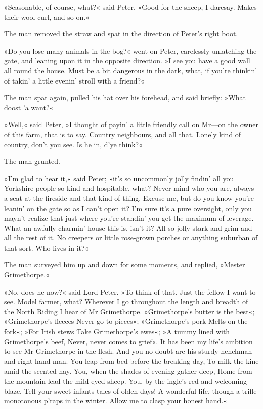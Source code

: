»Seasonable, of course, what?« said Peter. »Good for the sheep, I daresay. Makes their wool curl, and so on.«

The man removed the straw and spat in the direction of Peter's right boot.

»Do you lose many animals in the bog?« went on Peter, carelessly unlatching the gate, and leaning upon it in the opposite direction. »I see you have a good wall all round the house. Must be a bit dangerous in the dark, what, if you're thinkin' of takin' a little evenin' stroll with a friend?«

The man spat again, pulled his hat over his forehead, and said briefly:
»What doost 'a want?«

»Well,« said Peter, »I thought of payin' a little friendly call on Mr—on the owner of this farm, that is to say. Country neighbours, and all that. Lonely kind of country, don't you see. Is he in, d'ye think?«

The man grunted.

»I'm glad to hear it,« said Peter; »it's so uncommonly jolly findin' all you Yorkshire people so kind and hospitable, what? Never mind who you are, always a seat at the fireside and that kind of thing. Excuse me, but do you know you're leanin' on the gate so as I can't open it?  I'm sure it's a pure oversight, only you mayn't realize that just where you're standin' you get the maximum of leverage. What an awfully charmin' house this is, isn't it? All so jolly stark and grim and all the rest of it. No creepers or little rose-grown porches or anything suburban of that sort. Who lives in it?«

The man surveyed him up and down for some moments, and replied, »Mester Grimethorpe.«

»No, does he now?« said Lord Peter. »To think of that. Just the fellow I want to see. Model farmer, what? Wherever I go throughout the length and breadth of the North Riding I hear of Mr Grimethorpe.  »Grimethorpe's butter is the best«; »Grimethorpe's fleeces Never go to pieces«; »Grimethorpe's pork Melts on the fork«; »For Irish stews Take Grimethorpe's ewes«; »A tummy lined with Grimethorpe's beef, Never, never comes to grief«. It has been my life's ambition to see Mr  Grimethorpe in the flesh. And you no doubt are his sturdy henchman and right-hand man. You leap from bed before the breaking-day, To milk the kine amid the scented hay. You, when the shades of evening gather deep, Home from the mountain lead the mild-eyed sheep. You, by the ingle's red and welcoming blaze, Tell your sweet infants tales of olden days! A wonderful life, though a trifle monotonous p'raps in the winter. Allow me to clasp your honest hand.«

